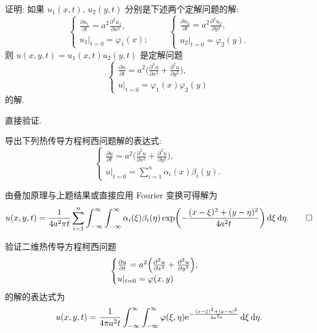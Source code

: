 \begin{exercise}[7]
  证明: 如果 $u_1(x,t)$, $u_2(y,t)$ 分别是下述两个定解问题的解:
  \[\begin{cases}
    \frac{\partial u_1}{\partial t} = a^2 \frac{\partial^2u_1}{\partial x^2}, \\
    u_1|_{t=0} = \varphi_1(x);
  \end{cases}
  \qquad
  \begin{cases}
    \frac{\partial u_2}{\partial t} = a^2 \frac{\partial^2u_2}{\partial y^2}, \\
    u_2|_{t=0} = \varphi_2(y).
  \end{cases}\]
  则 $u(x,y,t) = u_1(x,t)u_2(y,t)$ 是定解问题
  \[\begin{cases}
    \frac{\partial u}{\partial t} = a^2\biggl(
      \frac{\partial^2u}{\partial x^2} + \frac{\partial^2u}{\partial y^2}\biggr), \\
    u|_{t=0} = \varphi_1(x) \varphi_2(y)
  \end{cases}\]
  的解.
\end{exercise}

\begin{solution}
  直接验证.
\end{solution}


\begin{exercise}[8]
  导出下列热传导方程柯西问题解的表达式:
  \[\begin{cases}
    \frac{\partial u}{\partial t} 
      = a^2\biggl(\frac{\partial^2u}{\partial x^2} +
                  \frac{\partial^2u}{\partial y^2}\biggr), \\
    u|_{t=0} = \sum_{i=1}^n \alpha_i(x)\beta_i(y).
  \end{cases}\]
\end{exercise}

\begin{solution}
  由叠加原理与上题结果或直接应用 Fourier 变换可得解为
  \[u(x,y,t) = \frac{1}{4a^2\pi t} \sum_{i=1}^n \int_{-\infty}^{\infty}
    \int_{-\infty}^{\infty} \alpha_i(\xi) \beta_i(\eta)
      \exp\biggl(-\frac{(x-\xi)^2+(y-\eta)^2}{4a^2 t}\biggr) \mathop{}\!\mathrm{d}\xi\mathop{}\!\mathrm{d}\eta.\qedhere\]
\end{solution}


\begin{exercise}[9]
  验证二维热传导方程柯西问题
  \[\begin{cases}
    \frac{\partial u}{\partial t} = a^2 
      \Bigl(\frac{\partial^2 u}{\partial x^2} + \frac{\partial^2 u}{\partial y^2}\Bigr), \\
    u|_{t=0} = \varphi(x,y)
  \end{cases}\]
  的解的表达式为
  \[u(x,y,t) = \frac{1}{4\pi a^2t} \int_{-\infty}^{\infty}
    \int_{-\infty}^{\infty} \varphi(\xi,\eta) \mathrm{e}^{-\frac{(x-\xi)^2+(y-\eta)^2}{4a^2t}}
    \mathop{}\!\mathrm{d}\xi\mathop{}\!\mathrm{d}\eta.\]
\end{exercise}

